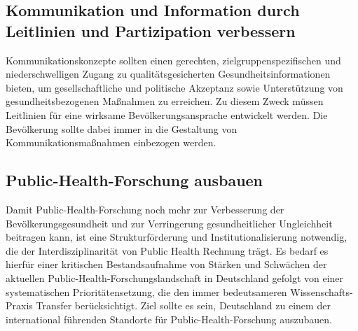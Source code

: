 \documentclass{article}
\begin{document}
\subsection{Kommunikation und Information durch Leitlinien und Partizipation verbessern}\label{H1657337}



Kommunikationskonzepte sollten einen gerechten, zielgruppenspezifischen und niederschwelligen Zugang zu qualitätsgesicherten Gesundheitsinformationen bieten, um gesellschaftliche und politische Akzeptanz sowie Unterstützung von gesundheitsbezogenen Maßnahmen zu erreichen. Zu diesem Zweck müssen Leitlinien für eine wirksame Bevölkerungsansprache entwickelt werden. Die Bevölkerung sollte dabei immer in die Gestaltung von Kommunikationsmaßnahmen einbezogen werden.


\subsection{Public-Health-Forschung ausbauen}\label{H6200254}



Damit Public-Health-Forschung noch mehr zur Verbesserung der Bevölkerungsgesundheit und zur Verringerung gesundheitlicher Ungleichheit beitragen kann, ist eine Strukturförderung und Institutionalisierung notwendig, die der Interdisziplinarität von Public Health Rechnung trägt. Es bedarf es hierfür einer kritischen Bestandsaufnahme von Stärken und Schwächen der aktuellen Public-Health-Forschungslandschaft in Deutschland gefolgt von einer systematischen Prioritätensetzung, die den immer bedeutsameren Wissenschafts-Praxis Transfer berücksichtigt. Ziel sollte es sein, Deutschland zu einem der international führenden Standorte für Public-Health-Forschung auszubauen.
\end{document}
